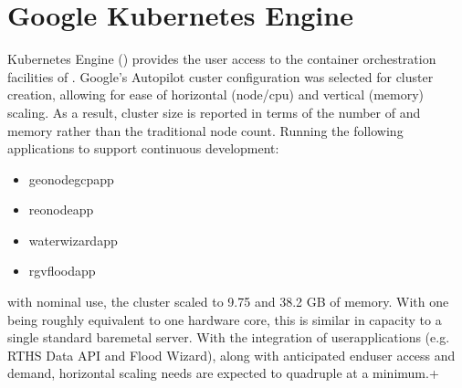 \documentclass[letterpaper,12pt,english,openany,oneside]{sphinxmanual}
\begin{document}
\section{Google Kubernetes Engine}
\label{\detokenize{euidev/infrastructure/index:google-kubernetes-engine}}
\sphinxAtStartPar
{} Kubernetes Engine () provides the user access to the container orchestration facilities of . Google’s Autopilot custer configuration was selected for cluster creation, allowing for ease of horizontal (node/cpu) and vertical (memory) scaling. As a result, cluster size is reported in terms of the number of  and memory rather than the traditional node count. Running the following applications to support continuous development:
\begin{itemize}
\item {} 
\sphinxAtStartPar
geonodegcp\sphinxhyphen{}app

\item {} 
\sphinxAtStartPar
reonode\sphinxhyphen{}app

\item {} 
\sphinxAtStartPar
waterwizard\sphinxhyphen{}app

\item {} 
\sphinxAtStartPar
rgvflood\sphinxhyphen{}app

\end{itemize}

\sphinxAtStartPar
with nominal use, the cluster scaled to 9.75  and 38.2 GB of memory. With one  being roughly equivalent to one hardware core, this is similar in capacity to a single standard bare\sphinxhyphen{}metal server. With the integration of user\sphinxhyphen{}applications (e.g. RTHS Data API and Flood Wizard), along with anticipated end\sphinxhyphen{}user access and demand, horizontal scaling needs are expected to quadruple at a minimum.+
\end{document}
